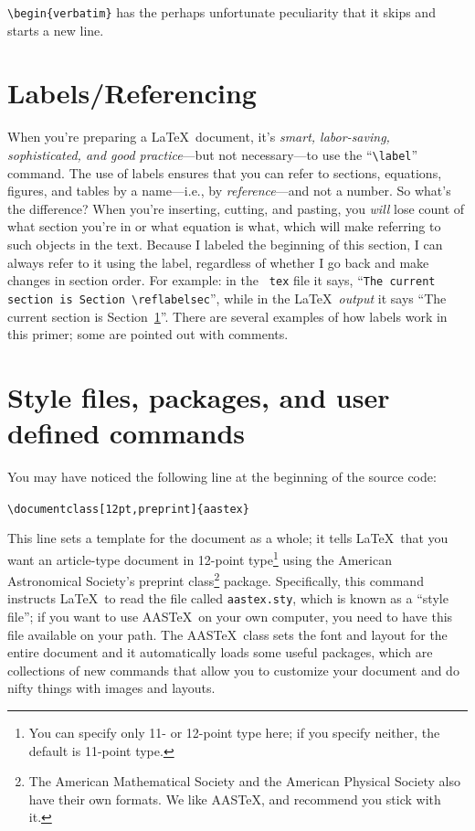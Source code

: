 \documentclass[12pt,preprint]{aastex}
\begin{document}
\noindent \verb$\begin{verbatim}$ has the perhaps unfortunate
peculiarity that it skips and starts a new line.

\section{Labels/Referencing}\label{labelsec}

When you're preparing a \LaTeX\ document, it's {\it smart, labor-saving,
  sophisticated, and good practice}---but not necessary---to use the
``\verb&\label&'' command.  The use of labels ensures that you can refer
to sections, equations, figures, and tables by a name---i.e., by {\it
  reference}---and not a number.  So what's the difference? When you're
inserting, cutting, and pasting, you {\it will} lose count of what
section you're in or what equation is what, which will make referring to
such objects in the text.  Because I labeled the beginning of this
section, I can always refer to it using the label, regardless of whether
I go back and make changes in section order.  For example: in the {\tt
  tex} file it says, ``{\tt The current section is
  Section~\verb&\&ref{labelsec}}'', while in the \LaTeX\ {\it output} it
says ``The current section is Section~\ref{labelsec}''.
There are several examples of how labels work in this primer; some are
pointed out with comments. 

\section{Style files, packages, and user defined commands}\label{stylesec}

        You may have noticed the following line at the beginning of the
source code: \begin{center} {\verb&\documentclass[12pt,preprint]{aastex}&}
\end{center} \noindent This line sets a template for the document as a
whole; it tells \LaTeX\ that you want an article-type document in
12-point type\footnote{You can specify only 11- or 12-point type here;
  if you specify neither, the default is 11-point type.} using the
American Astronomical Society's preprint class\footnote{The American
  Mathematical Society and the American Physical Society also have their
  own formats.  We like AAS\TeX, and recommend you stick with it.}
package.  Specifically, this command instructs \LaTeX \ to read the file
called \verb$aastex.sty$, which is known as a ``style file''; if you
want to use AAS\TeX \ on your own computer, you need to have this file
available on your path. The AAS\TeX\ class sets the font and layout for
the entire document and it automatically loads some useful packages,
which are collections of new commands that allow you to customize your
document and do nifty things with images and layouts.
\end{document}
